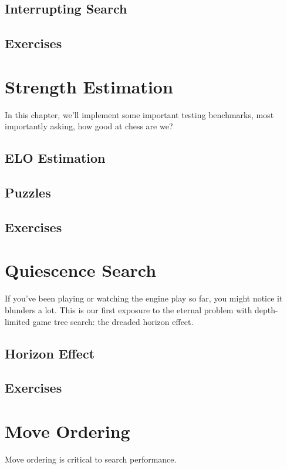 \documentclass[letterpaper,11pt]{article}
\begin{document}
\subsection{Interrupting Search}
\subsection{Exercises}

\section{Strength Estimation}

In this chapter, we'll implement some important testing benchmarks, most importantly asking,
how good at chess are we?

\subsection{ELO Estimation}
\subsection{Puzzles}
\subsection{Exercises}

\section{Quiescence Search}

If you've been playing or watching the engine play so far, you might notice it blunders a lot. This is our first 
exposure to the eternal problem with depth-limited game tree search: the dreaded horizon effect.

\subsection{Horizon Effect}

\subsection{Exercises}

\section{Move Ordering}
Move ordering is critical to search performance.
\end{document}
